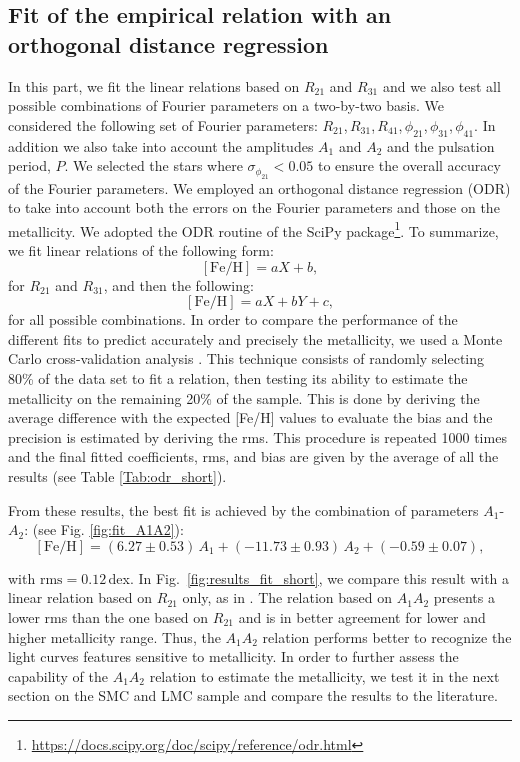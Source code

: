 \documentclass[article]{aa} %
\begin{document}
\subsection{Fit of the empirical relation with an orthogonal distance regression}\label{sect:short_result}
In this part, we fit the linear relations based on $R_{21}$ and $R_{31}$ and we also test all possible combinations of Fourier parameters on a two-by-two basis. We considered the following set of Fourier parameters: $R_{21}$,$\,R_{31}$,$\,R_{41}$,$\,\phi_{21}$,$\,\phi_{31}$,$\,\phi_{41}$. In addition we also take into account the amplitudes $A_1$ and $A_2$ and the pulsation period, $P$. We selected the stars where $\sigma_{\phi_{21}}<0.05$ to ensure the overall accuracy of the Fourier parameters. We employed an orthogonal distance regression (ODR) to take into account both the errors on the Fourier parameters and those on the metallicity. We adopted the ODR routine of the SciPy
package\footnote{\url{https://docs.scipy.org/doc/scipy/reference/odr.html}}. To summarize, we fit linear relations of the following form:
\begin{equation}
    \mathrm{[Fe/H]}=aX+b,
\end{equation}
for $R_{21}$ and $R_{31}$, and then the following:
\begin{equation}
    \mathrm{[Fe/H]}=aX+bY+c,
\end{equation}
for all possible combinations. In
order to compare the performance of the different fits to predict
accurately and precisely the metallicity, we used a Monte Carlo cross-validation analysis \citep{XU2001}. This technique consists of  randomly selecting 80\% of the data set to fit a relation, then testing its ability to estimate the metallicity on the remaining 20\% of the sample. This is done by deriving the average difference with the expected [Fe/H] values to evaluate the bias and the precision is estimated by deriving the rms. This procedure is repeated 1000 times and the final fitted coefficients, rms, and bias are given by the average of all the results (see Table \ref{Tab:odr_short}).

From these results, the best fit is achieved by the combination
of parameters $A_1$-$A_2$: (see Fig. \ref{fig:fit_A1A2}):
\begin{equation}
    \mathrm{[Fe/H]}=(6.27\pm0.53)\,A_1 + (-11.73\pm0.93)\,A_2 + (-0.59\pm0.07),
    \label{eq:SHORT_eq}
\end{equation}

 with $\mathrm{rms}=0.12\,$dex. In Fig.~\ref{fig:results_fit_short}, we compare this result with a linear relation based on $R_{21}$ only, as in \cite{Klagyivik2013}. The relation based on $A_1A_2$ presents a lower rms than the one based on $R_{21}$ and is in better agreement for lower and higher metallicity range. Thus, the $A_1A_2$ relation performs better to recognize the light curves features sensitive to metallicity.
 In order to further assess the capability of the $A_1A_2$ relation to estimate the metallicity, we test it in the next section on the SMC and LMC sample and compare the results to the literature. 
\end{document}
